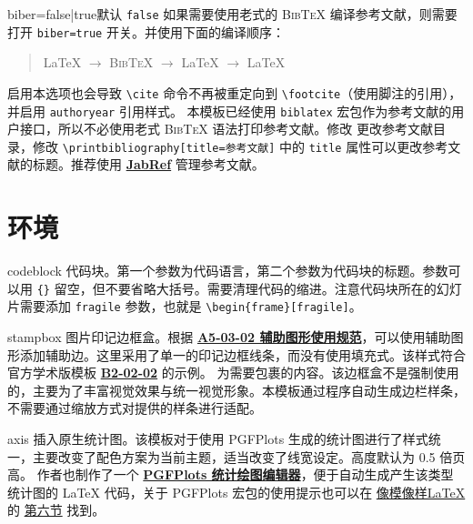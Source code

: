 \documentclass[a4paper,12pt]{article}
\begin{document}
\begin{CJK}{UTF8}{song}
\begin{docKey*}[SJTUBeamer]{biber}{=false|true}{默认 \texttt{false}}
    如果需要使用老式的 \textsc{Bib\TeX{}} 编译参考文献，则需要打开 \verb"biber=true" 开关。并使用下面的编译顺序：
    \begin{quotation}
        \LaTeX{} $\rightarrow$ \textsc{Bib\TeX{}} $\rightarrow$ \LaTeX{} $\rightarrow$ \LaTeX{}
    \end{quotation}
    启用本选项也会导致 \verb"\cite" 命令不再被重定向到 \verb"\footcite"（使用脚注的引用），并启用 \verb"authoryear" 引用样式。
    本模板已经使用 \verb"biblatex" 宏包作为参考文献的用户接口，所以不必使用老式 \textsc{Bib\TeX{}} 语法打印参考文献。修改 \verb"" 更改参考文献目录，修改 \verb"\printbibliography[title=参考文献]" 中的 \verb"title" 属性可以更改参考文献的标题。推荐使用 \href{https://www.jabref.org/}{\textbf{JabRef}} 管理参考文献。
\end{docKey*}

\section{环境}

\begin{docEnvironment*}[doc parameter=\marg{language}\marg{title}, doclang/environment content=code]{codeblock}{}
    代码块。第一个参数为代码语言，第二个参数为代码块的标题。参数可以用 \verb"{}" 留空，但不要省略大括号。需要清理代码的缩进。注意代码块所在的幻灯片需要添加 \verb"fragile" 参数，也就是 \verb"\begin{frame}[fragile]"。
\end{docEnvironment*}

\begin{docEnvironment*}[doclang/environment content=code]{stampbox}{}
    图片印记边框盒。根据 \href{http://vi.sjtu.edu.cn/index.php/articles/base/5}{\textbf{A5-03-02 辅助图形使用规范}}，可以使用辅助图形添加辅助边。这里采用了单一的印记边框线条，而没有使用填充式。该样式符合官方学术版模板 \href{http://vi.sjtu.edu.cn/index.php/articles/app/8}{\textbf{B2-02-02}} 的示例。 为需要包裹的内容。该边框盒不是强制使用的，主要为了丰富视觉效果与统一视觉形象。本模板通过程序自动生成边栏样条，不需要通过缩放方式对提供的样条进行适配。
\end{docEnvironment*}

\begin{docEnvironment*}[doclang/environment content=code]{axis}{}
    插入原生统计图。该模板对于使用 \textsf{PGFPlots} 生成的统计图进行了样式统一，主要改变了配色方案为当前主题，适当改变了线宽设定。高度默认为 0.5 倍页高。
    作者也制作了一个 \href{https://logcreative.github.io/PGFPlotsEdt/index.html?lang=cn}{\textbf{PGFPlots 统计绘图编辑器}}，便于自动生成产生该类型统计图的 \LaTeX{} 代码，关于 \textsf{PGFPlots} 宏包的使用提示也可以在 \href{https://logcreative.github.io/LaTeXSparkle/}{像模像样\LaTeX} 的 \href{https://logcreative.github.io/LaTeXSparkle/src/art/chapter06.html}{第六节} 找到。
\end{docEnvironment*}


\end{CJK}
\end{document}
